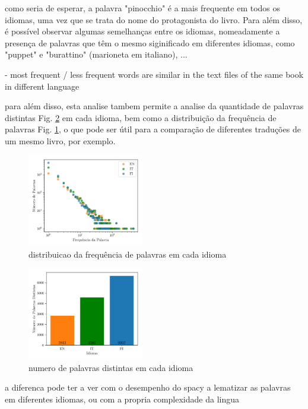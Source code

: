 \documentclass[mirror, portugues]{revdetua}
\begin{document}
como seria de esperar, a palavra "pinocchio" é a mais frequente em todos os idiomas, uma vez que se trata do nome do protagonista do livro. Para além disso, é possível observar algumas semelhanças entre os idiomas, nomeadamente a presença de palavras que têm o mesmo siginificado em diferentes idiomas, como "puppet" e "burattino" (marioneta em italiano), ...

- most frequent / less frequent words are similar in the text files of the same book in different language

para além disso, esta analise tambem permite a analise da quantidade de palavras distintas Fig. \ref{fig:distinc_words} em cada idioma, bem como a distribuição da frequência de palavras Fig. \ref{fig:word_freqs}, o que pode ser útil para a comparação de diferentes traduções de um mesmo livro, por exemplo.

\begin{figure}[H]
    \centering
    \includegraphics[width=0.45\textwidth]{../assets/exact_word_freqs.png}
    \caption{distribuicao da frequência de palavras em cada idioma}
    \label{fig:word_freqs}
\end{figure}


\begin{figure}[H]
    \centering
    \includegraphics[width=0.45\textwidth]{../assets/exact_distinct_words.png}
    \caption{numero de palavras distintas em cada idioma}
    \label{fig:distinc_words}
\end{figure}

a diferenca pode ter a ver com o desempenho do spacy a lematizar as palavras em diferentes idiomas, ou com a propria complexidade da lingua 
\end{document}
